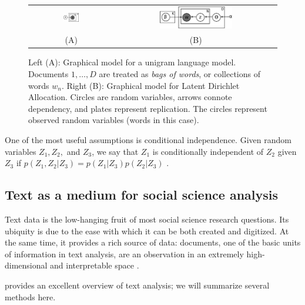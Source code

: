 \begin{figure}
  \begin{center}
    \begin{tabular}{cc}
      \includegraphics[width=0.2\textwidth]{chapter_introductory_material/figs/bagofwords_gm.pdf} & 
      \includegraphics[width=0.4667\textwidth]{chapter_introductory_material/figs/lda_gm.pdf} \\
      (A) & (B) \\
    \end{tabular}
  \end{center}
  \caption{Left (A): Graphical model for a unigram language model.  Documents $1, \ldots, D$ are
    treated as \emph{bags of words}, or collections of words $w_n$.
    Right (B): Graphical model for Latent Dirichlet Allocation.  Circles are random variables, arrows connote dependency, and plates represent replication.  The circles represent observed random variables (words in this case).}
  \label{figure:bagofwords_lda_gm}
\end{figure}

One of the most useful assumptions is conditional independence.  Given
random variables $Z_1, Z_2,$ and $Z_3$, we say that $Z_1$ is
conditionally independent of $Z_2$ given $Z_3$ if $p(Z_1, Z_2 | Z_3) =
p(Z_1 | Z_3) p(Z_2 | Z_3)$ \cite{bishop:2006}.

\subsection{Text as a medium for social science analysis}
  \label{section:text_intro}
  Text data is the low-hanging fruit of most social science research
  questions.  Its ubiquity is due to the ease with which it can be
  both created and digitized.  At the same time, it provides a rich
  source of data: documents, one of the basic units of information in
  text analysis, are an observation in an extremely high-dimensional
  and interpretable space \cite{changrtl:2009}.

  \cite{grimmer:submitted} provides an excellent overview of text
  analysis; we will summarize several methods here.

